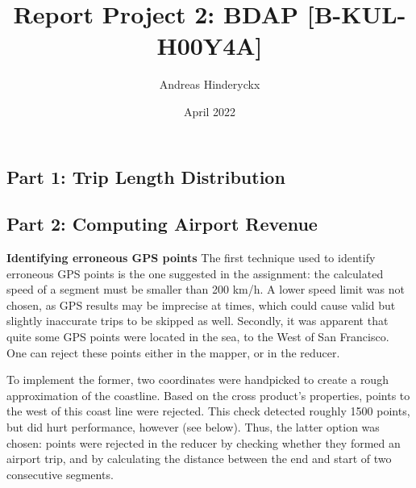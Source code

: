 \documentclass[12pt]{article}
\title{Report Project 2: BDAP [B-KUL-H00Y4A]}
\author{Andreas Hinderyckx}
\date{April 2022}
\newcommand{\todo}{{\color{red}{\textbf{TODO }}}}
\begin{document}
\maketitle


\subsection*{Part 1: Trip Length Distribution}
\subsection*{Part 2: Computing Airport Revenue}

\textbf{Identifying erroneous GPS points}
The first technique used to identify erroneous GPS points is the one suggested in the assignment: the calculated speed of a segment must be smaller than 200 km/h. A lower speed limit was not chosen, as GPS results may be imprecise at times, which could cause valid but slightly inaccurate trips to be skipped as well. Secondly, it was apparent that quite some GPS points were located in the sea, to the West of San Francisco. One can reject these points either in the mapper, or in the reducer. 



To implement the former, two coordinates were handpicked to create a rough approximation of the coastline. Based on the cross product's properties, points to the west of this coast line were rejected. This check detected roughly 1500 points, but did hurt performance, however (see below). Thus, the latter option was chosen: points were rejected in the reducer by \todo checking whether they formed an airport trip, and by calculating the distance between the end and start of two consecutive segments.

\end{document}
